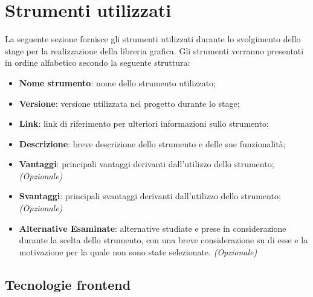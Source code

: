 \section{Strumenti utilizzati}
La seguente sezione fornisce gli strumenti utilizzati durante lo svolgimento dello stage per la realizzazione della libreria grafica.
Gli strumenti verranno presentati in ordine alfabetico secondo la seguente struttura:
\begin{itemize}
      \item \textbf{Nome strumento}: nome dello strumento utilizzato;
      \item \textbf{Versione}: versione utilizzata nel progetto durante lo stage;
      \item \textbf{Link}: link di riferimento per ulteriori informazioni sullo strumento;
      \item \textbf{Descrizione}: breve descrizione dello strumento e delle sue funzionalità;
      \item \textbf{Vantaggi}: principali vantaggi derivanti dall'utilizzo dello strumento; \textit{(Opzionale)}
      \item \textbf{Svantaggi}: principali svantaggi derivanti dall'utilizzo dello strumento; \textit{(Opzionale)}
      \item \textbf{Alternative Esaminate}: alternative studiate e prese in considerazione durante la scelta dello strumento, con una breve considerazione
            su di esse e la motivazione per la quale non sono state selezionate. \textit{(Opzionale)}
\end{itemize}

\subsection{Tecnologie frontend}


